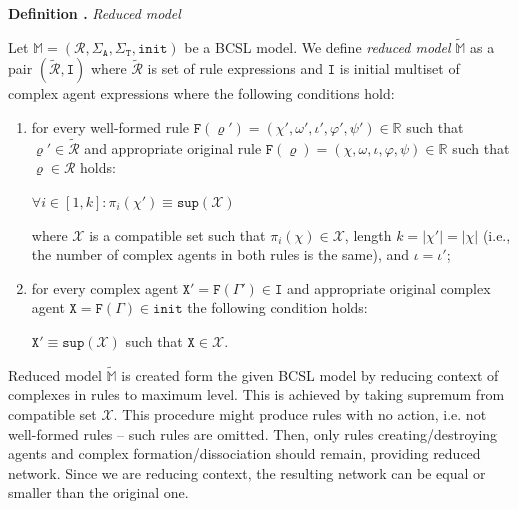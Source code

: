 \documentclass[12pt, twoside]{fithesis2} %
\newcounter{counter}[section]
\renewcommand{\thecounter}{\thesection.\arabic{counter}}
\newenvironment{definition}[1]{\bigskip\refstepcounter{counter}\noindent\textbf{Definition \thecounter } \emph{#1} \par\nopagebreak \begin{itshape}}{\end{itshape}\bigskip}
\begin{document}
\begin{definition}{Reduced model}
\label{reduced_model}
Let $\mathds{M} = (\mathcal{R}, \Sigma_\mathtt{A}, \Sigma_\mathtt{T}, \mathtt{init})$ be a BCSL model. We define \emph{reduced model} $\widetilde{\mathds{M}}$ as a pair $(\widetilde{\mathcal{R}}, \mathtt{I})$ where $\widetilde{\mathcal{R}}$ is set of rule expressions and $\mathtt{I}$ is initial multiset of complex agent expressions where the following conditions hold:

\begin{enumerate}
	\item for every well-formed rule $\mathtt{F}(\varrho') = (\chi', \omega', \iota', \varphi', \psi') \in \mathds{R}$ such that $\varrho' \in \widetilde{\mathcal{R}}$ and appropriate original rule $\mathtt{F}(\varrho) = (\chi, \omega, \iota, \varphi, \psi) \in \mathds{R}$ such that $\varrho \in \mathcal{R}$ holds:

	\begin{center}
	$\forall i \in [1, k]: \pi_i(\chi') \equiv \mathtt{sup}(\mathscr{X})$
	\end{center}

	where $\mathscr{X}$ is a compatible set such that $\pi_i(\chi) \in \mathscr{X}$, length $k = |\chi'| = |\chi|$ (i.e., the number of complex agents in both rules is the same), and $\iota = \iota'$;

	\item for every complex agent $\mathtt{X}' = \mathtt{F}(\Gamma') \in \mathtt{I}$ and appropriate original complex agent $\mathtt{X} = \mathtt{F}(\Gamma) \in \mathtt{init}$ the following condition holds:

	\begin{center}
	$ \mathtt{X}' \equiv \mathtt{sup}(\mathscr{X}) $ such that $\mathtt{X} \in \mathscr{X}$.
	\end{center}
\end{enumerate}
\end{definition}

Reduced model $\widetilde{\mathds{M}}$ is created form the given BCSL model by reducing context of complexes in rules to maximum level. This is achieved by taking supremum from compatible set $\mathscr{X}$. This procedure might produce rules with no action, i.e. not well-formed rules -- such rules are omitted. Then, only rules creating/destroying agents and complex formation/dissociation should remain, providing reduced network. Since we are reducing context, the resulting network can be equal or smaller than the original one.
\end{document}
